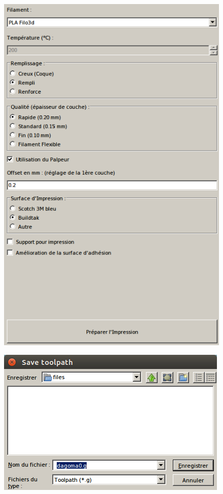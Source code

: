\documentclass{article}
\begin{document}
\begin{figure}[h!]
\centering
\includegraphics[scale=0.25]{./images/cura9.png}
\end{figure}\hfill 
\newpage
\begin{figure}[h!]
\centering
\includegraphics[scale=0.3]{./images/cura8.png}
\end{figure}\hfill 
\end{document}
